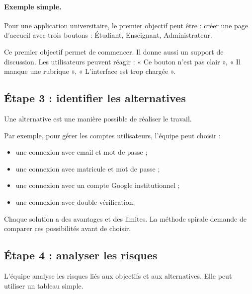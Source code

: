 \documentclass[12pt,a4paper]{article}
\begin{document}
\paragraph{Exemple simple.}
Pour une application universitaire, le premier objectif peut être : créer une page d'accueil avec trois boutons : Étudiant, Enseignant, Administrateur.

Ce premier objectif permet de commencer. Il donne aussi un support de discussion. Les utilisateurs peuvent réagir : « Ce bouton n'est pas clair », « Il manque une rubrique », « L'interface est trop chargée ».

\subsection{Étape 3 : identifier les alternatives}

Une alternative est une manière possible de réaliser le travail.

Par exemple, pour gérer les comptes utilisateurs, l'équipe peut choisir :

\begin{itemize}
    \item une connexion avec email et mot de passe ;
    \item une connexion avec matricule et mot de passe ;
    \item une connexion avec un compte Google institutionnel ;
    \item une connexion avec double vérification.
\end{itemize}

Chaque solution a des avantages et des limites. La méthode spirale demande de comparer ces possibilités avant de choisir.

\subsection{Étape 4 : analyser les risques}

L'équipe analyse les risques liés aux objectifs et aux alternatives. Elle peut utiliser un tableau simple.
\end{document}
